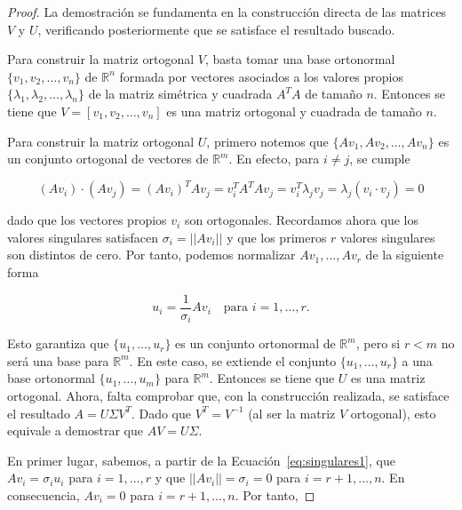 \begin{proof}
    La demostración se fundamenta en la construcción directa de las matrices $V$ y $U$, verificando posteriormente que se satisface el resultado buscado.\newline

    Para construir la matriz ortogonal $V$, basta tomar una base ortonormal $\{v_1, v_2, \ldots, v_n \}$ de $\mathbb{R}^{n}$ formada por vectores asociados a los valores propios $\{\lambda_1, \lambda_2, \ldots, \lambda_n\}$ de la matriz simétrica y cuadrada $A^{T}A$ de tamaño $n$. Entonces se tiene que $V = [v_1, v_2, \ldots, v_n]$ es una matriz ortogonal y cuadrada de tamaño $n$.\newline

    Para construir la matriz ortogonal $U$, primero notemos que $\{Av_1, Av_2, \ldots, Av_n \}$ es un conjunto ortogonal de vectores de $\mathbb{R}^{m}$. En efecto, para $i \neq j$, se cumple

    \[ (Av_i)\cdot(Av_j) = (Av_i)^{T}Av_j=v_{i}^{T}A^{T}Av_j = v_{i}^{T}\lambda_j v_j=\lambda_j(v_i \cdot v_j) = 0\]

    dado que los vectores propios $v_i$ son ortogonales. Recordamos ahora que los valores singulares satisfacen $\sigma_i = ||Av_i||$ y que los primeros $r$ valores singulares son distintos de cero. Por tanto, podemos normalizar $Av_1, \ldots, Av_r$ de la siguiente forma

    \begin{equation}
        u_i = \frac{1}{\sigma_i} A v_i \quad \text{para } i = 1, \ldots, r.
        \label{eq:singulares1}
    \end{equation}
    

    Esto garantiza que $\{ u_1, \ldots, u_r\}$ es un conjunto ortonormal de $\mathbb{R}^{m}$, pero si $r < m$ no será una base para $\mathbb{R}^{m}$. En este caso, se extiende el conjunto $\{u_1, \ldots, u_r \}$ a una base ortonormal $\{u_1, \ldots, u_m \}$ para $\mathbb{R}^{m}$. Entonces se tiene que $U$ es una matriz ortogonal. Ahora, falta comprobar que, con la construcción realizada, se satisface el resultado $A = U \Sigma V^{T}$. Dado que $V^{T} = V^{-1}$ (al ser la matriz $V$ ortogonal), esto equivale a demostrar que $AV = U\Sigma$.\newline

    En primer lugar, sabemos, a partir de la Ecuación~\eqref{eq:singulares1}, que $Av_i=\sigma_i u_i$ para $i=1, \ldots, r$ y que $||A v_i|| = \sigma_i = 0$ para $i=r+1, \ldots,n$. En consecuencia, $Av_i = 0$ para $i=r+1, \ldots,n$. Por tanto, \newline


\end{proof}
